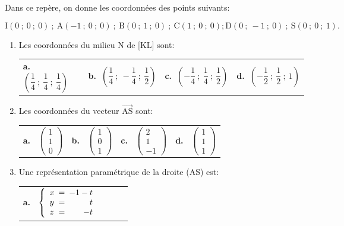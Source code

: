 \documentclass[10pt]{article}
\providecommand{\vect}[1]{\overrightarrow{#1}}
\begin{document}
Dans ce repère, on donne les coordonnées des points suivants:

\[\text{I}(0~;~0~;~0) \:;\: \text{A}(-1~;~0~;~0) \:;\: \text{B}(0~;~1~;~0) \:;\: \text{C}(1~;~0~;~0); \text{D}(0~;~-1~;~0) \:;\: \text{S}(0~;~0~;~1).\]

\begin{enumerate}[resume]
\item  Les coordonnées du milieu N de [KL] sont:
\begin{center}
\begin{tabularx}{\linewidth}{*{4}{X}}
\textbf{a.~} $\left(\dfrac{1}{4}~;~\dfrac{1}{4}~;~\dfrac{1}{4}\right)$&\textbf{b.~}$\left(\dfrac{1}{4}~;~- \dfrac{1}{4}~;~\dfrac{1}{2}\right)$&\textbf{c.~}$\left(-\dfrac{1}{4}~;~\dfrac{1}{4}~;~\dfrac{1}{2}\right)$&\textbf{d.~}$\left(-\dfrac{1}{2}~;~\dfrac{1}{2}~;~1\right)$
\end{tabularx}
\end{center}
\item  Les coordonnées du vecteur $\vect{\text{AS}}$ sont:
\begin{center}
\begin{tabularx}{\linewidth}{*{4}{X}}
\textbf{a.~} $\begin{pmatrix}1\\1\\0 \end{pmatrix}$&\textbf{b.~}  $\begin{pmatrix}1\\0\\1 \end{pmatrix}$&\textbf{c.~} $\begin{pmatrix}2\\1\\-1 \end{pmatrix}$ &\textbf{d.~} $\begin{pmatrix} 1\\1\\1\end{pmatrix}$
\end{tabularx}
\end{center}
\item Une représentation paramétrique de la droite (AS) est:
{\footnotesize \begin{center}
\begin{tabularx}{\linewidth}{*{4}{X}}
\textbf{a.~} $\left\{\begin{array}{l !{=} r}x&-1-t\\y&t\\z&-t
\end{array}\right.$


\end{tabularx}
\end{center}}
\end{enumerate}
\end{document}
